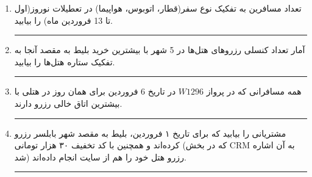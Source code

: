 \begin{enumerate}
	
	
	
	\item
	تعداد مسافرین به تفکیک نوع سفر(قطار، اتوبوس، هواپیما) در تعطیلات نوروز(اول تا 13 فروردین ماه) را بیابید.
	
	
	\rule{\linewidth}{0.05mm}
	
	
	
	
	\item
	آمار تعداد کنسلی رزروهای هتل‌ها در 5 شهر با بیشترین خرید بلیط به مقصد آنجا به‌ تفکیک ستاره هتل‌ها را بیابید.
	
	
	\rule{\linewidth}{0.05mm}	 
	
	
	
	\item
	همه مسافرانی که در پرواز $W1296$ در تاریخ 6 فروردین برای همان روز در هتلی با بیشترین اتاق خالی رزرو دارند.
	
	
	\rule{\linewidth}{0.05mm}
	
	
	
	\item
	مشتریانی را بیابید که برای تاریخ ۱ فروردین، بلیط به مقصد شهر بابلسر رزرو کرده‌اند و همچنین \linebreak با کد تخفیف ۳۰ هزار تومانی (که در بخش CRM به‌ آن اشاره شد) رزرو هتل خود را هم از سایت انجام داده‌اند.
	
	
	\rule{\linewidth}{0.05mm}	 
	
	
	
\end{enumerate}